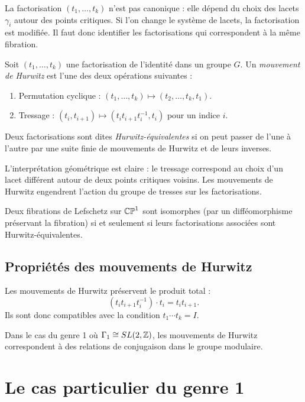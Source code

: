 La factorisation $(t_1,\dots,t_k)$ n'est pas canonique : elle dépend du choix des lacets $\gamma_i$ autour des points critiques. Si l'on change le système de lacets, la factorisation est modifiée. Il faut donc identifier les factorisations qui correspondent à la même fibration.

\begin{definition}
Soit $(t_1,\dots,t_k)$ une factorisation de l'identité dans un groupe $G$. Un \emph{mouvement de Hurwitz} est l'une des deux opérations suivantes :
\begin{enumerate}
\item Permutation cyclique : $(t_1,\dots,t_k) \mapsto (t_2,\dots,t_k,t_1)$.
\item Tressage : $(t_i, t_{i+1}) \mapsto (t_i t_{i+1} t_i^{-1}, t_i)$ pour un indice $i$.
\end{enumerate}
Deux factorisations sont dites \emph{Hurwitz-équivalentes} si on peut passer de l'une à l'autre par une suite finie de mouvements de Hurwitz et de leurs inverses.
\end{definition}

L'interprétation géométrique est claire : le tressage correspond au choix d'un lacet différent autour de deux points critiques voisins. Les mouvements de Hurwitz engendrent l'action du groupe de tresses sur les factorisations.

\begin{theoreme}
Deux fibrations de Lefschetz sur $\mathbb{CP}^1$ sont isomorphes (par un difféomorphisme préservant la fibration) si et seulement si leurs factorisations associées sont Hurwitz-équivalentes.
\end{theoreme}

\subsection{Propriétés des mouvements de Hurwitz}

Les mouvements de Hurwitz préservent le produit total :
\[
(t_i t_{i+1} t_i^{-1}) \cdot t_i = t_i t_{i+1}.
\]
Ils sont donc compatibles avec la condition $t_1\cdots t_k = I$.

Dans le cas du genre 1 où $\Gamma_1 \cong SL(2,\mathbb{Z})$, les mouvements de Hurwitz correspondent à des relations de conjugaison dans le groupe modulaire.

\section{Le cas particulier du genre 1}

